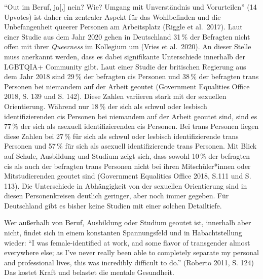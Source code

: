 \documentclass[a4paper,
fontsize=11pt,
oneside,
numbers=noperiodatend,
parskip=half-,
bibliography=totoc,
final
]{scrartcl}
\begin{document}
\enquote{Out im Beruf, ja{[},{]} nein? Wie? Umgang mit Unverständnis und
Vorurteilen} (14 Upvotes) ist daher ein zentraler Aspekt für das
Wohlbefinden und die Unbefangenheit queerer Personen am Arbeitsplatz
(Riggle et al.~2017). Laut einer Studie aus dem Jahr 2020 gehen in
Deutschland 31\,\% der Befragten nicht offen mit ihrer \emph{Queerness}
im Kollegium um (Vries et al.~2020). An dieser Stelle muss anerkannt
werden, dass es dabei signifikante Unterschiede innerhalb der LGBTQIA+
Community gibt. Laut einer Studie der britischen Regierung aus dem Jahr
2018 sind 29\,\% der befragten cis Personen und 38\,\% der befragten trans
Personen bei niemandem auf der Arbeit geoutet (Government Equalities
Office 2018, S. 139 und S. 142). Diese Zahlen variieren stark mit der
sexuellen Orientierung. Während nur 18\,\% der sich als schwul oder
lesbisch identifizierenden cis Personen bei niemandem auf der Arbeit
geoutet sind, sind es 77\,\% der sich als asexuell identifizierenden cis
Personen. Bei trans Personen liegen diese Zahlen bei 27\,\% für sich als
schwul oder lesbisch identifizierende trans Personen und 57\,\% für sich
als asexuell identifizierende trans Personen. Mit Blick auf Schule,
Ausbildung und Studium zeigt sich, dass sowohl 10\,\% der befragten cis
als auch der befragten trans Personen nicht bei ihren Mitschüler*innen
oder Mitstudierenden geoutet sind (Government Equalities Office 2018,
S.111 und S. 113). Die Unterschiede in Abhängigkeit von der sexuellen
Orientierung sind in diesen Personenkreisen deutlich geringer, aber noch
immer gegeben. Für Deutschland gibt es bisher keine Studien mit einer
solchen Detailtiefe.

Wer außerhalb von Beruf, Ausbildung oder Studium geoutet ist, innerhalb
aber nicht, findet sich in einem konstanten Spannungsfeld und in
Habachtstellung wieder: \enquote{I was female-identified at work, and
some flavor of transgender almost everywhere else; as I've never really
been able to completely separate my personal and professional lives,
this was incredibly difficult to do.} (Roberto 2011, S. 124) Das kostet
Kraft und belastet die mentale Gesundheit.
\end{document}
